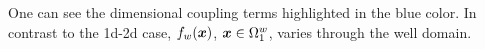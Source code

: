One can see the dimensional coupling terms highlighted in the blue color.
In contrast to the 1d-2d case, $f_w(\mathbf{\boldsymbol{x}})$, $\mathbf{\boldsymbol{x}}\in\Omega^w_1$, varies through the well domain.

